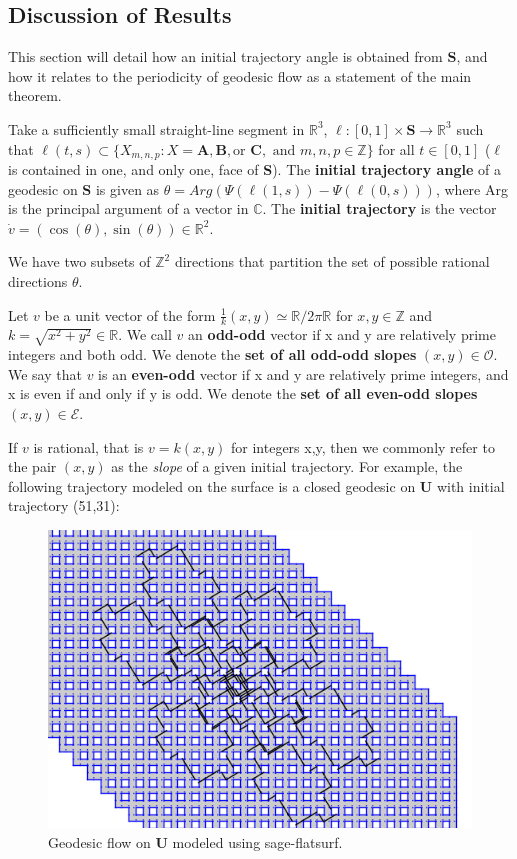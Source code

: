 \documentclass[]{article}
\begin{document}
\subsection{Discussion of Results}
This section will detail how an initial trajectory angle is obtained from $\mathbf{S}$, and how it relates to the periodicity of geodesic flow as a statement of the main theorem.

\begin{Def}
Take a sufficiently small straight-line segment in $\mathbb{R}^3$, $\ell:[0,1]\times\mathbf{S}\rightarrow\mathbb{R}^3$ such that $\ell(t,s)\subset \{X_{m,n,p}: X=\mathbf{A}, \mathbf{B}, \text{or }\mathbf{C}, \text{ and } m,n,p\in\mathbb{Z}\}$ for all $t\in[0,1]$ ($\ell$ is contained in one, and only one, face of $\mathbf{S}$). The \textbf{initial trajectory angle} of a geodesic on $\mathbf{S}$ is given as $\theta=Arg(\Psi(\ell(1,s))-\Psi(\ell(0,s)))$, where Arg is the principal argument of a vector in $\mathbb{C}$. The \textbf{initial trajectory} is the vector $\dot{v}=(\cos(\theta),\sin(\theta))\in\mathbb{R}^2$.
\begin{figure}[H]
\centering

\end{figure}
\end{Def}

\noindent We have two subsets of $\mathbb Z^2$ directions that partition the set of possible rational directions $\theta$.
\begin{Def}
Let $v$ be a unit vector of the form $\frac{1}{k}(x,y)\simeq\mathbb{R}/2\pi\mathbb{R}$ for $x,y\in\mathbb{Z}$ and $k=\sqrt{x^2+y^2}\in\mathbb{R}$.  We call $v$ an \textbf{odd-odd} vector if x and y are relatively prime integers and both odd. We denote the \textbf{set of all odd-odd slopes} $(x,y)\in\mathcal{O}$. We say that $v$ is an \textbf{even-odd} vector if x and y are relatively prime integers, and x is even if and only if y is odd. We denote the \textbf{set of all even-odd slopes} $(x,y)\in\mathcal{E}$.
\end{Def}

If $v$ is rational, that is $v=k(x,y)$ for integers x,y, then we commonly refer to the pair $(x,y)$ as the \emph{slope} of a given initial trajectory. For example, the following trajectory modeled on the surface is a closed geodesic on $\mathbf{U}$ with initial trajectory (51,31):

\begin{figure}[H]
\centering
\includegraphics[width=4in.]{closed2.png}
\caption{Geodesic flow on $\mathbf{U}$ modeled using sage-flatsurf.}
\end{figure}
\end{document}
